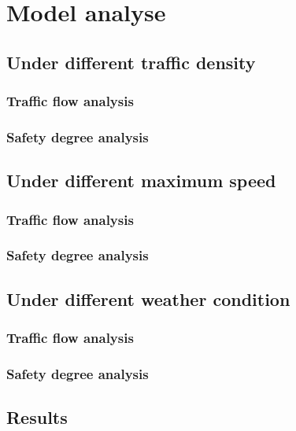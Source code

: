 
\section{Model analyse}

\subsection{Under different traffic density}

\subsubsection{Traffic flow analysis}

\subsubsection{Safety degree analysis}

\subsection{Under different maximum speed}

\subsubsection{Traffic flow analysis}

\subsubsection{Safety degree analysis}

\subsection{Under different weather condition}

\subsubsection{Traffic flow analysis}

\subsubsection{Safety degree analysis}

\subsection{Results}

